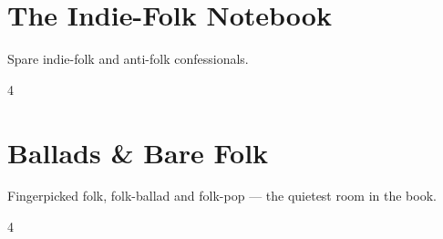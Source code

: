 \documentclass[a4paper,landscape]{memoir}
\begin{document}
\chapter{The Indie-Folk Notebook}
Spare indie-folk and anti-folk confessionals.
\clearpage\begin{multicols*}{4}
\end{multicols*}

\chapter{Ballads \& Bare Folk}
Fingerpicked folk, folk-ballad and folk-pop — the quietest room in the book.
\clearpage\begin{multicols*}{4}
\end{multicols*}
\end{document}
